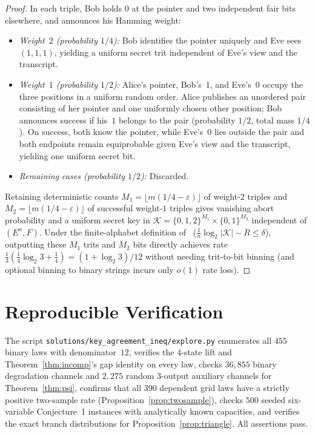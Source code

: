 \documentclass[11pt]{article}
\theoremstyle{plain}
\theoremstyle{definition}
\theoremstyle{remark}
\begin{document}
\begin{proof}
In each triple, Bob holds $0$ at the pointer and two independent fair bits elsewhere, and announces his Hamming weight:
\begin{itemize}[leftmargin=1.5em]
\item \emph{Weight~$2$ (probability $1/4$):} Bob identifies the pointer uniquely and Eve sees $(1, 1, 1)$, yielding a uniform secret trit independent of Eve's view and the transcript.
\item \emph{Weight~$1$ (probability $1/2$):} Alice's pointer, Bob's~$1$, and Eve's~$0$ occupy the three positions in a uniform random order. Alice publishes an unordered pair consisting of her pointer and one uniformly chosen other position; Bob announces success if his~$1$ belongs to the pair (probability $1/2$, total mass $1/4$). On success, both know the pointer, while Eve's~$0$ lies outside the pair and both endpoints remain equiprobable given Eve's view and the transcript, yielding one uniform secret bit.
\item \emph{Remaining cases (probability $1/2$):} Discarded.
\end{itemize}
Retaining deterministic counts $M_1 = \lfloor m(1/4 - \varepsilon) \rfloor$ of weight-$2$ triples and $M_2 = \lfloor m(1/4 - \varepsilon) \rfloor$ of successful weight-$1$ triples gives vanishing abort probability and a uniform secret key in $\mathcal{K} = \{0, 1, 2\}^{M_1} \times \{0, 1\}^{M_2}$ independent of $(E^n, F)$.
Under the finite-alphabet definition of~\cite{AbinGohari2026} ($\frac{1}{n}\log_2 |\mathcal{K}| - R \le \delta$), outputting these $M_1$ trits and $M_2$ bits directly achieves rate $\frac{1}{3}(\frac{1}{4}\log_2 3 + \frac{1}{4}) = (1 + \log_2 3)/12$ without needing trit-to-bit binning (and optional binning to binary strings incurs only $o(1)$ rate loss).
\end{proof}

\section{Reproducible Verification}

The script \texttt{solutions/key\_agreement\_ineq/explore.py} enumerates all $455$ binary laws with denominator~$12$, verifies the $4$-state lift and Theorem~\ref{thm:incomp}'s gap identity on every law, checks $36{,}855$ binary degradation channels and $2{,}275$ random $3$-output auxiliary channels for Theorem~\ref{thm:psi}, confirms that all $390$ dependent grid laws have a strictly positive two-sample rate (Proposition~\ref{prop:twosample}), checks $500$ seeded six-variable Conjecture~1 instances with analytically known capacities, and verifies the exact branch distributions for Proposition~\ref{prop:triangle}. All assertions pass.
\end{document}
